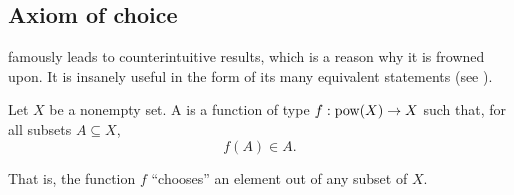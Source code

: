 \subsection{Axiom of choice}\label{subsec:axiom_of_choice}

\begin{remark}\label{rem:aoc}
   famously leads to counterintuitive results, which is a reason why it is frowned upon. It is insanely useful in the form of its many equivalent statements (see ).
\end{remark}

\begin{definition}\label{def:choice_function}
  Let \( X \) be a nonempty set. A  is a function of type \( f: \operatorname{pow}(X) \to X \) such that, for all subsets \( A \subseteq X \),
  \begin{equation*}
    f(A) \in A.
  \end{equation*}

  That is, the function \( f \) \enquote{chooses} an element out of any subset of \( X \).
\end{definition}

